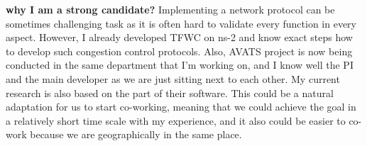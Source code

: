
\textsf{\textbf{why I am a strong candidate?}} Implementing a network protocol
can be sometimes challenging task as it is often hard to validate every function
in every aspect.  However, I already developed TFWC on ns-2 and know exact steps
how to develop such congestion control protocols.  Also, AVATS project is now
being conducted in the same department that I'm working on, and I know well the
PI and the main developer as we are just sitting next to each other.  My current
research is also based on the part of their software.  This could be a natural
adaptation for us to start co-working, meaning that we could achieve the goal in
a relatively short time scale with my experience, and it also could be easier to
co-work because we are geographically in the same place.

